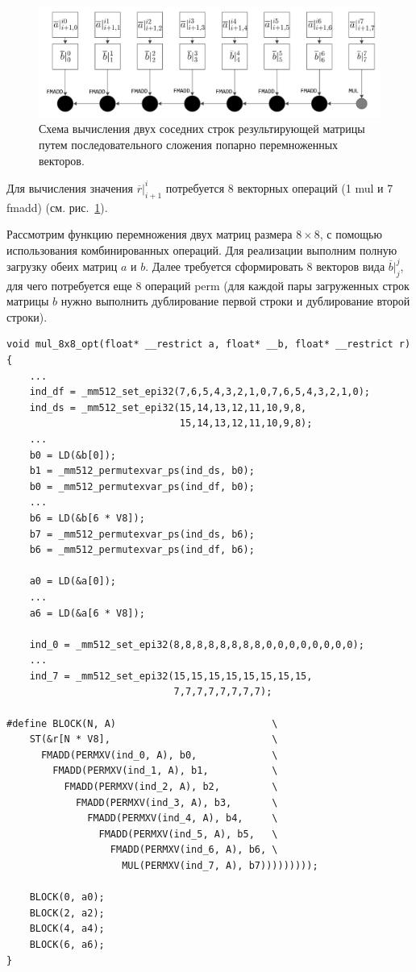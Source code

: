 \begin{figure}[ht]
\centering
\includegraphics[width=1.00\textwidth]{./fig/vec_spec_matrices_fmadd.pdf}
\singlespacing
{}\caption{Схема вычисления двух соседних строк результирующей матрицы путем последовательного сложения попарно перемноженных векторов.}
\label{fig:text_4_spec_matr_fmadd}
\end{figure}

Для вычисления значения $\overline{r}|_{i + 1}^i$ потребуется 8 векторных операций (1 mul и 7 fmadd) (см. рис.~\ref{fig:text_4_spec_matr_fmadd}).

Рассмотрим функцию перемножения двух матриц размера $8 \times 8$, с помощью использования комбинированных операций.
Для реализации выполним полную загрузку обеих матриц $a$ и $b$.
Далее требуется сформировать 8 векторов вида $\overline{b}|_j^j$, для чего потребуется еще 8 операций perm (для каждой пары загруженных строк матрицы $b$ нужно выполнить дублирование первой строки и дублирование второй строки).

\begin{lstlisting}[caption={Векторизованная версия перемножения матриц $8 \times 8$.},label={lst:text_4_spec_matr_mul8x8_opt}]
void mul_8x8_opt(float* __restrict a, float* __b, float* __restrict r)
{
    ...
    ind_df = _mm512_set_epi32(7,6,5,4,3,2,1,0,7,6,5,4,3,2,1,0);
    ind_ds = _mm512_set_epi32(15,14,13,12,11,10,9,8,
                              15,14,13,12,11,10,9,8);
    ...
    b0 = LD(&b[0]);
    b1 = _mm512_permutexvar_ps(ind_ds, b0);
    b0 = _mm512_permutexvar_ps(ind_df, b0);
    ...
    b6 = LD(&b[6 * V8]);
    b7 = _mm512_permutexvar_ps(ind_ds, b6);
    b6 = _mm512_permutexvar_ps(ind_df, b6);

    a0 = LD(&a[0]);
    ...
    a6 = LD(&a[6 * V8]);

    ind_0 = _mm512_set_epi32(8,8,8,8,8,8,8,8,0,0,0,0,0,0,0,0);
    ...
    ind_7 = _mm512_set_epi32(15,15,15,15,15,15,15,15,
                             7,7,7,7,7,7,7,7);

#define BLOCK(N, A)                           \
    ST(&r[N * V8],                            \
      FMADD(PERMXV(ind_0, A), b0,             \
        FMADD(PERMXV(ind_1, A), b1,           \
          FMADD(PERMXV(ind_2, A), b2,         \
            FMADD(PERMXV(ind_3, A), b3,       \
              FMADD(PERMXV(ind_4, A), b4,     \
                FMADD(PERMXV(ind_5, A), b5,   \
                  FMADD(PERMXV(ind_6, A), b6, \
                    MUL(PERMXV(ind_7, A), b7)))))))));

    BLOCK(0, a0);
    BLOCK(2, a2);
    BLOCK(4, a4);
    BLOCK(6, a6);
}
\end{lstlisting}


